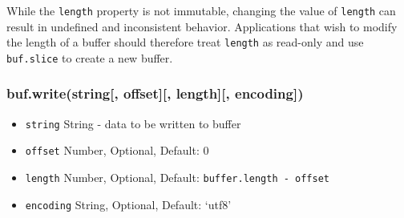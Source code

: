 \begin{Shaded}
\begin{Highlighting}[]
 \NormalTok{(}\NormalTok{);}

\NormalTok{(}\NormalTok{);}
\NormalTok{(}\NormalTok{, }\NormalTok{, }\NormalTok{);}
\NormalTok{(}\NormalTok{);}

\end{Highlighting}
\end{Shaded}

While the \texttt{length} property is not immutable, changing the value
of \texttt{length} can result in undefined and inconsistent behavior.
Applications that wish to modify the length of a buffer should therefore
treat \texttt{length} as read-only and use \texttt{buf.slice} to create
a new buffer.

\begin{Shaded}
\begin{Highlighting}[]
 \NormalTok{(}\NormalTok{);}
\NormalTok{(}\NormalTok{, }\NormalTok{, }\NormalTok{);}
\NormalTok{(}\NormalTok{); }
\NormalTok{(}\NormalTok{,}\NormalTok{);}
\NormalTok{(}\NormalTok{); }
\end{Highlighting}
\end{Shaded}

\subsubsection{buf.write(string{[}, offset{]}{[}, length{]}{[},
encoding{]})}\label{buf.writestring-offset-length-encoding}

\begin{itemize}
\itemsep1pt\parskip0pt
\item
  \texttt{string} String - data to be written to buffer
\item
  \texttt{offset} Number, Optional, Default: 0
\item
  \texttt{length} Number, Optional, Default:
  \texttt{buffer.length\ -\ offset}
\item
  \texttt{encoding} String, Optional, Default: `utf8'
\end{itemize}

